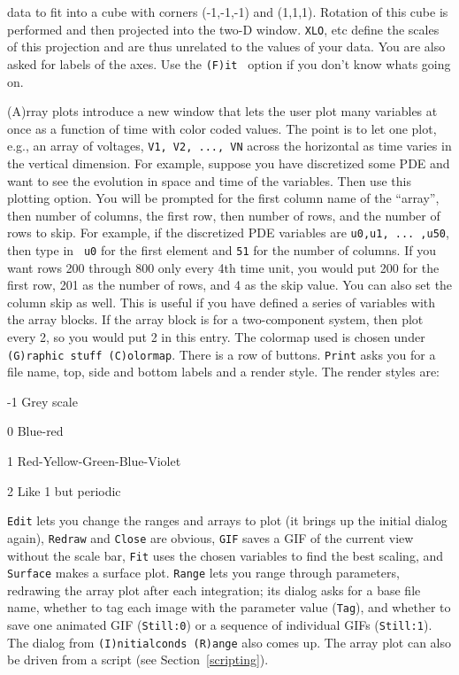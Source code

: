 \documentclass{article}
\newcommand{\tc}[1]{\addcontentsline{toc}{subsection}{#1}}
\begin{document}
\begin{description}
data to fit into a cube with corners (-1,-1,-1) and (1,1,1).  Rotation of this
 cube is performed and then projected into the two-D window.  {\tt XLO}, etc define
 the scales of this projection and are thus unrelated to the values of your 
data.  You are also asked for labels of the axes.
Use the {\tt (F)it } option if you don't know whats going on.
\tc{Space-time plots} (A)rray plots introduce a new window that lets the user plot many
variables at once as a function of time with color coded values.  The
point is to let one plot, e.g., an array of voltages, {\tt V1, V2,
..., VN} across the horizontal as time varies in the vertical
dimension. For example, suppose you have discretized some PDE and want
to see the evolution in space and time of the variables.  Then use
this plotting option. You will be prompted for the first column name
of the ``array'', then number of columns, the first row, then number
of rows, and the number of rows to skip. For example, if the
discretized PDE variables are {\tt u0,u1, ... ,u50}, then type in {\tt
u0} for the first element and {\tt 51} for the number of columns.
If you want rows 200
through 800 only every 4th time unit, you would put 200 for the first
row, 201 as the number of rows, and 4 as the skip value.  
You can also set the column skip as well. This is useful if you have
defined a series of variables with the array blocks. If the array
block is for a two-component system, then plot every 2, so you would
put 2 in this entry. The colormap used is chosen
under {\tt (G)raphic stuff (C)olormap}.  There is a row of buttons.
{\tt Print} asks you for a file name, top, side and bottom labels and a
render style. The render styles are:
\begin{description}
\item{-1} Grey scale
\item{0} Blue-red
\item{1} Red-Yellow-Green-Blue-Violet
\item{2} Like 1 but periodic
\end{description}
{\tt Edit} lets
you change the ranges and arrays to plot (it brings up the initial dialog again), {\tt Redraw} and {\tt Close} are obvious, {\tt GIF} saves a GIF of the
current view without the scale bar, {\tt Fit} uses the chosen variables to find the best scaling,
and {\tt Surface} makes a surface plot.  {\tt Range} lets you range through
parameters, redrawing the array plot after each integration; its dialog asks for a base file name, whether to
tag each image with the parameter value ({\tt Tag}), and whether to save one animated GIF
({\tt Still:0}) or a sequence of individual GIFs ({\tt Still:1}).  The dialog from
{\tt (I)nitialconds (R)ange} also comes up.  The array plot can also be driven from a script (see Section~\ref{scripting}).


\end{description}
\end{document}
